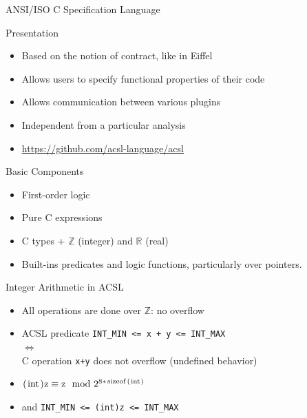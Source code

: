 \documentclass[pdf,xcolor={svgnames}]{beamer}
\begin{document}
\begin{frame}[fragile,label=ACSL]{ANSI/ISO C Specification Language}
\begin{block}{Presentation}
\begin{itemize}
\item Based on the notion of contract, like in Eiffel
\item Allows users to specify functional properties of their code
\item Allows communication between various plugins
\item Independent from a particular analysis
\item \url{https://github.com/acsl-language/acsl}
\end{itemize}
\end{block}
\begin{block}{Basic Components}
\begin{itemize}
\item First-order logic
\item Pure C expressions
\item C types + $\mathbb{Z}$ (integer) and $\mathbb{R}$ (real)
\item Built-ins predicates and logic functions, particularly over
pointers.
\end{itemize}
\end{block}
\end{frame}

\begin{frame}[fragile]{Integer Arithmetic in ACSL}
\lstset{language=ACSL}
\begin{itemize}
\item All operations are done over $\mathbb{Z}$: \alert{no overflow}
\item ACSL predicate \lstinline|INT_MIN <= x + y <= INT_MAX|\\
 $\Leftrightarrow$\\
 C operation \lstinline|x+y| does not overflow (undefined behavior)
\item $\text{\lstinline|(int)z|}\equiv\text{\lstinline|z|}\mod 2^{8*\text{\lstinline|sizeof(int)|}}$
\item and \lstinline|INT_MIN <= (int)z <= INT_MAX|
\end{itemize}
\end{frame}
\end{document}
